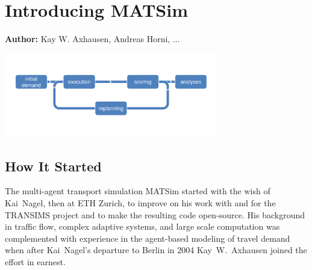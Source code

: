 \chapter{Introducing MATSim}
\label{ch:introducing}
\hfill \textbf{Author:} Kay W. Axhausen, Andreas Horni, ...

\begin{center} \includegraphics[width=0.7\textwidth, angle=0]{figures/matsimcycle.pdf} \end{center}



\section{How It Started}
The multi-\gls{agent} transport simulation MATSim \citep[][]{MATSIM-T_Webpage_2014} started with the wish of Kai~Nagel, then at ETH Zurich, to improve on his work with and for the TRANSIMS project \citep[][]{SmithEtAl_NTRPAC_1995} and to make the resulting code open-source. His background in traffic flow, complex adaptive systems, and large scale computation was complemented with experience in the agent-based modeling of travel demand when after Kai~Nagel's departure to Berlin in 2004 Kay~W.~Axhausen joined the effort in earnest. 

